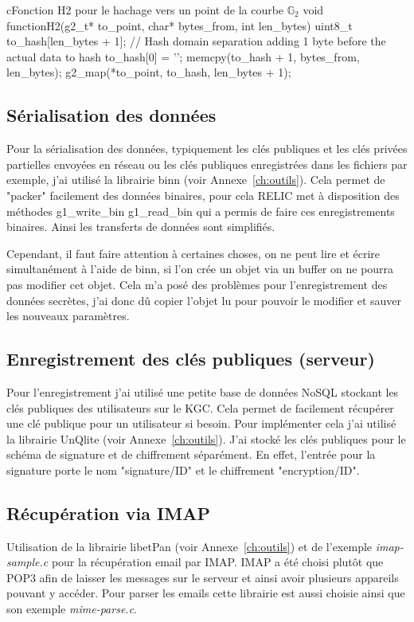 \begin{sourcebox}{c}{Fonction H2 pour le hachage vers un point de la courbe $\mathbb{G}_2$}
	void functionH2(g2_t* to_point, char* bytes_from, int len_bytes){
		uint8_t to_hash[len_bytes + 1];
		// Hash domain separation adding 1 byte  before the actual data to hash
		to_hash[0] = '';
		memcpy(to_hash + 1, bytes_from, len_bytes);
		g2_map(*to_point, to_hash, len_bytes + 1);
	}
\end{sourcebox}

\subsection{Sérialisation des données}
Pour la sérialisation des données, typiquement les clés publiques et les clés privées partielles envoyées en réseau ou les clés publiques enregistrées dans les fichiers par exemple, j'ai utilisé la librairie binn (voir Annexe~\ref{ch:outils}). Cela permet de "packer" facilement des données binaires, pour cela RELIC met à disposition des méthodes g1\_write\_bin g1\_read\_bin qui a permis de faire ces enregistrements binaires. Ainsi les transferts de données sont simplifiés.

Cependant, il faut faire attention à certaines choses, on ne peut lire et écrire simultanément à l'aide de binn, si l'on crée un objet via un buffer on ne pourra pas modifier cet objet. Cela m'a posé des problèmes pour l'enregistrement des données secrètes, j'ai donc dû copier l'objet lu pour pouvoir le modifier et sauver les nouveaux paramètres.

\subsection{Enregistrement des clés publiques (serveur)}
Pour l'enregistrement j'ai utilisé une petite base de données NoSQL stockant les clés publiques des utilisateurs sur le KGC. Cela permet de facilement récupérer une clé publique pour un utilisateur si besoin. Pour implémenter cela j'ai utilisé la librairie UnQlite (voir Annexe~\ref{ch:outils}). J'ai stocké les clés publiques pour le schéma de signature et de chiffrement séparément. En effet, l'entrée pour la signature porte le nom "signature/ID" et le chiffrement "encryption/ID".

\subsection{Récupération via IMAP}
Utilisation de la librairie libetPan (voir Annexe~\ref{ch:outils}) et de l'exemple \textit{imap-sample.c} pour la récupération email par IMAP. IMAP a été choisi plutôt que POP3 afin de laisser les messages sur le serveur et ainsi avoir plusieurs appareils pouvant y accéder. Pour parser les emails cette librairie est aussi choisie ainsi que son exemple \textit{mime-parse.c}.

